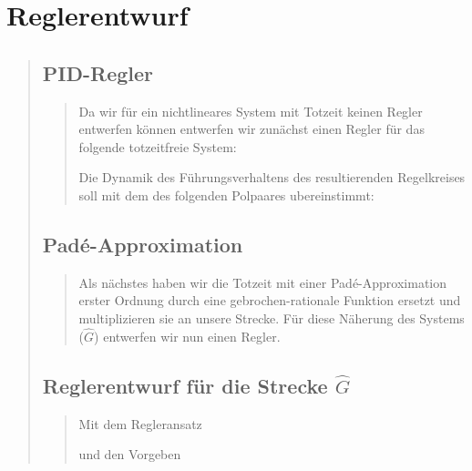 \section{Reglerentwurf}
\begin{quote}
	\hspace{-2em}
	\subsection{PID-Regler}
	\label{aufg:3.1}
    \begin{quote}
        
        Da wir für ein nichtlineares System mit Totzeit keinen Regler entwerfen können entwerfen wir zunächst einen
        Regler für das folgende totzeitfreie System:
        
        
        Die Dynamik des Führungsverhaltens des resultierenden Regelkreises soll mit dem des folgenden Polpaares
        ubereinstimmt:
        
        
        
    \end{quote}
    
    
    \subsection{Pad\'e-Approximation}
    \begin{quote}
        
        Als nächstes haben wir die Totzeit mit einer Pad\'e-Approximation erster Ordnung durch eine gebrochen-rationale
        Funktion ersetzt und multiplizieren sie an unsere Strecke. Für diese Näherung des Systems ($\hat{G}$) entwerfen
        wir nun einen Regler.
        
        
    \end{quote}
    
    \subsection{Reglerentwurf für die Strecke $\hat{G}$}
    \begin{quote}
        
        Mit dem Regleransatz\\
        
        
        und den Vorgeben\\
        

\end{quote}
\end{quote}
